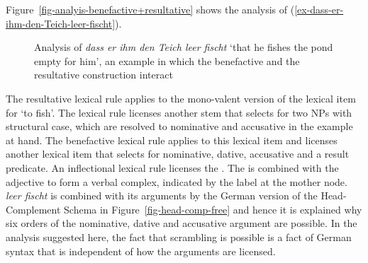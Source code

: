 Figure~\vref{fig-analyis-benefactive+resultative} shows the analysis of (\ref{ex-dass-er-ihm-den-Teich-leer-fischt}).
\begin{figure}
\caption{Analysis of \emph{dass er ihm den Teich leer fischt} `that he fishes the pond empty for him', an example in which the benefactive
  and the resultative construction interact}\label{fig-analyis-benefactive+resultative}
\end{figure}
The resultative lexical rule applies to the mono-valent version of the lexical item for 
`to fish'. The lexical rule licenses another stem that selects for two NPs with structural case, which are
resolved to nominative and accusative in the example at hand. The benefactive lexical rule applies
to this lexical item and licenses another lexical item that selects for nominative, dative,
accusative and a result predicate. An inflectional lexical rule licenses the \vnull. The \vnull is
combined with the adjective to form a verbal complex, indicated by the label \vnull at the mother
node. \emph{leer fischt} is combined with its arguments by the German version of the Head-Complement
Schema in Figure~\ref{fig-head-comp-free} and hence it is explained why six orders of the nominative, dative and accusative argument
are possible. In the analysis suggested here, the fact that scrambling is possible is a fact of German syntax that is independent of
how the arguments are licensed.

